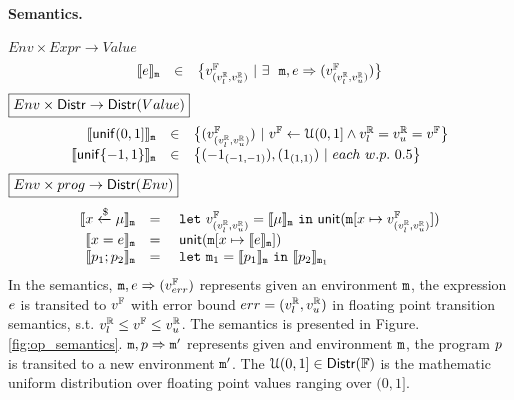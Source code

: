 \documentclass[a4paper,11pt]{article}
\begin{document}
\paragraph{Semantics.}
$\boxed{Env \times Expr \to Value }$
%
\[
	\begin{array}{rcl}
	\llbracket e \rrbracket_{\mathtt{m}}
	& \in &  
	\big\{v^{\mathbb{F}}_{(v^{\mathbb{R}}_{l}, v^{\mathbb{R}}_{u})} ~|~
	\exists ~~  
	\mathtt{m},  
	e \Rightarrow (v^{\mathbb{F}}_{(v^{\mathbb{R}}_{l}, v^{\mathbb{R}}_{u})})\big\}
	\end{array}
\]
%
$
\boxed{Env \times \mathsf{Distr} \to 
\mathsf{Distr}(Value)}
$
%
\[
	\begin{array}{rcl}
	\llbracket \mathsf{unif}(0, 1] \rrbracket_{\mathtt{m}}
	& \in & 
	\big\{
	(v^{\mathbb{F}}_{(v^{\mathbb{R}}_{l}, v^{\mathbb{R}}_{u})}) ~|~
	v^{\mathbb{F}} \leftarrow \mathcal{U}(0, 1]
	\land v^{\mathbb{R}}_{l} = v^{\mathbb{R}}_{u} = v^{\mathbb{F}}
	\big\}\\
	\llbracket \mathsf{unif}\{-1, 1\} \rrbracket_{\mathtt{m}}
	& \in & 
	\big\{
	(-1_{(-1, -1)}), (1_{(1, 1)}) ~|~
	each ~ w.p. ~ 0.5 
	\big\}\\	
	\end{array}
\]
%
$\boxed{Env \times prog \to \mathsf{Distr}(Env)}$
\[
\begin{array}{rcl}
	\llbracket x \xleftarrow{\$} \mu \rrbracket_{\mathtt{m}}
	& = & 
	~\mathtt{let}~ v^{\mathbb{F}}_{(v^{\mathbb{R}}_{l}, v^{\mathbb{R}}_{u})} = \llbracket \mu \rrbracket_{\mathtt{m}}
	~\mathtt{in}~ 
	\mathsf{unit}(\mathtt{m}[x \mapsto v^{\mathbb{F}}_{(v^{\mathbb{R}}_{l}, v^{\mathbb{R}}_{u})}])
	\\
	\llbracket x = e \rrbracket_{\mathtt{m}}
	& = &  
	~\mathsf{unit}(\mathtt{m}[x \mapsto \llbracket e \rrbracket_{\mathtt{m}}])
	\\
	\llbracket p_1; p_2 \rrbracket_{\mathtt{m}}
	& = &  ~\mathtt{let}~  \mathtt{m}_1 = 
	\llbracket p_1 \rrbracket_{\mathtt{m}} ~\mathtt{in}~
	\llbracket p_2 \rrbracket_{\mathtt{m}_1} 
\end{array}
\]
%
In the semantics, 
%
$\mathtt{m}, e \Rightarrow (v^{\mathbb{F}}_{err})$ represents given an environment
%
$\mathtt{m}$, the expression $e$
%
is transited to $v^{\mathbb{F}}$ with error bound $err = (v^{\mathbb{R}}_{l}, v^{\mathbb{R}}_{u})$
in floating point transition semantics,
%
s.t. $v^{\mathbb{R}}_{l} \leq v^{\mathbb{F}} \leq v^{\mathbb{R}}_{u}$. The semantics is presented in Figure. \ref{fig:op_semantics}.
%
$\mathtt{m}, p \Rightarrow \mathtt{m}'$ represents given and environment $\mathtt{m}$,
%
the program $p$ is transited to a new environment $\mathtt{m}'$.
%
The $\mathcal{U}(0, 1] \in \mathsf{Distr}(\mathbb{F})$ is the mathematic uniform distribution over floating point values ranging over $(0, 1]$.
%
%
\end{document}
